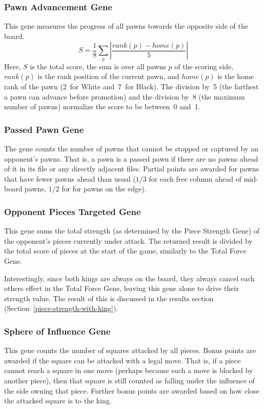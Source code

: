 \documentclass[letterpaper]{article}
\renewcommand{\_}{\allowbreak\textunderscore\allowbreak}
\begin{document}
\subsubsection{Pawn Advancement Gene}
This gene measures the progress of all pawns towards the opposite side of the board.
\[S = \frac{1}{8}\sum_p \left|\frac{rank(p) - home(p)}{5}\right|\]
Here, \(S\) is the total score, the sum is over all pawns \(p\) of the scoring side, \(rank(p)\) is the rank position of the current pawn, and \(home(p)\) is the home rank of the pawn (2~for White and~7~for Black). The division by~5 (the farthest a pawn can advance before promotion) and the division by~8 (the maximum number of pawns) normalize the score to be between~0 and~1.

\subsubsection{Passed Pawn Gene}
The gene counts the number of pawns that cannot be stopped or captured by an opponent's pawns. That is, a pawn is a passed pawn if there are no pawns ahead of it in its file or any directly adjacent files. Partial points are awarded for pawns that have fewer pawns ahead than usual (\(1/3\) for each free column ahead of mid-board pawns, \(1/2\) for for pawns on the edge).

\subsubsection{Opponent Pieces Targeted Gene}\label{opponent-pieces-targeted}
This gene sums the total strength (as determined by the Piece Strength Gene) of the opponent's pieces currently under attack. The returned result is divided by the total score of pieces at the start of the game, similarly to the Total Force Gene.

Interestingly, since both kings are always on the board, they always cancel each others effect in the Total Force Gene, leaving this gene alone to drive their strength value. The result of this is discussed in the results section (Section~\ref{piece-strength-with-king}).

\subsubsection{Sphere of Influence Gene}
This gene counts the number of squares attacked by all pieces. Bonus points are awarded if the square can be attacked with a legal move. That is, if a piece cannot reach a square in one move (perhaps because such a move is blocked by another piece), then that square is still counted as falling under the influence of the side owning that piece. Further bonus points are awarded based on how close the attacked square is to the king.
\end{document}

